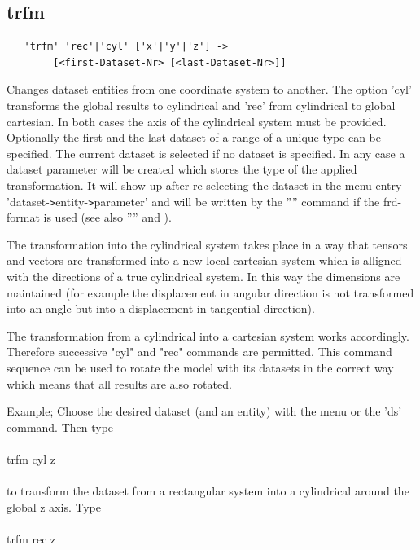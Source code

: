\documentclass{article}
\begin{document}
\subsection{\label{trfm}trfm}
\begin{verbatim}
   'trfm' 'rec'|'cyl' ['x'|'y'|'z'] ->
        [<first-Dataset-Nr> [<last-Dataset-Nr>]]
\end{verbatim}
Changes dataset entities from one coordinate system to another. The option
'cyl' transforms the global results to cylindrical and 'rec' from cylindrical
to global cartesian. In both cases the axis of the cylindrical system must be
provided. Optionally the first and the last dataset of a range of a unique
type can be specified. The current dataset is selected if no dataset is
specified. In any case a dataset parameter will be created which stores the type of the applied transformation. It will show up after re-selecting the dataset in the menu entry 'dataset-\verb_>_entity-\verb_>_parameter' and will be written by the '''' command if the frd-format is used (see also '''' and ).

The transformation into the cylindrical system takes place in a way that tensors and vectors are transformed into a new local cartesian system which is alligned with the directions of a true cylindrical system. In this way the dimensions are maintained (for example the displacement in angular direction is not transformed into an angle but into a displacement in tangential direction).

The transformation from a cylindrical into a cartesian system works accordingly. Therefore successive "cyl" and "rec" commands are permitted. This command sequence can be used to rotate the model with its datasets in the correct way which means that all results are also rotated.

Example; Choose the desired dataset (and an entity) with the menu or the 'ds' command. Then type\\\\

trfm cyl z\\\\

to transform the dataset from a rectangular system into a cylindrical around the global z axis. Type\\\\

trfm rec z\\\\
\end{document}
